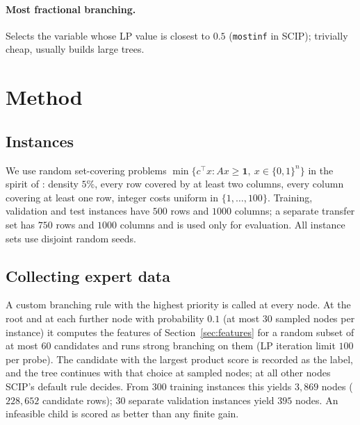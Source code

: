 \documentclass[11pt,a4paper]{article}
\newcommand{\sbr}[1]{\texttt{#1}}
\begin{document}
\paragraph{Most fractional branching.} Selects the variable whose LP value is closest to $0.5$ (\sbr{mostinf} in SCIP); trivially cheap, usually builds large trees.
 
\section{Method}
\subsection{Instances}
We use random set-covering problems $\min\{c^\top x : Ax\ge \mathbf 1,\ x\in\{0,1\}^n\}$ in the spirit of \citet{balas1980set}: density $5\%$, every row covered by at least two columns, every column covering at least one row, integer costs uniform in $\{1,\dots,100\}$. Training, validation and test instances have $500$ rows and $1000$ columns; a separate transfer set has $750$ rows and $1000$ columns and is used only for evaluation. All instance sets use disjoint random seeds.
 
\subsection{Collecting expert data}
A custom branching rule with the highest priority is called at every node. At the root and at each further node with probability $0.1$ (at most $30$ sampled nodes per instance) it computes the features of Section~\ref{sec:features} for a random subset of at most $60$ candidates and runs strong branching on them (LP iteration limit $100$ per probe). The candidate with the largest product score is recorded as the label, and the tree continues with that choice at sampled nodes; at all other nodes SCIP's default rule decides. From $300$ training instances this yields $3{,}869$ nodes ($228{,}652$ candidate rows); $30$ separate validation instances yield $395$ nodes. An infeasible child is scored as better than any finite gain.
 
\end{document}
